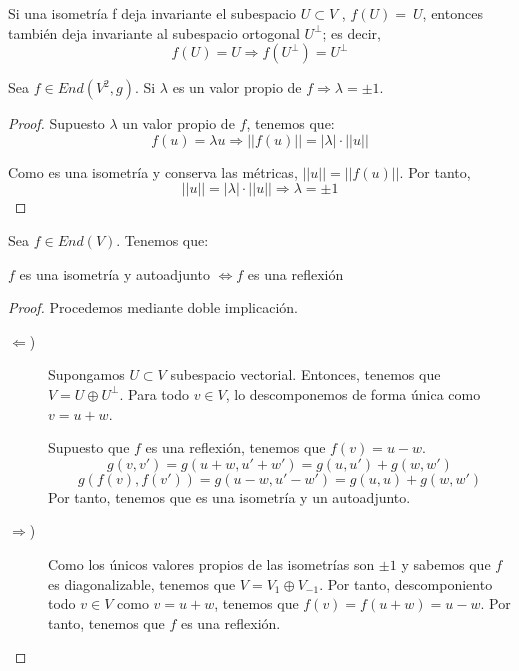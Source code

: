 \begin{prop}
    Si una isometría f deja invariante el subespacio $U \subset V$ , $f(U) =~U$, entonces también deja invariante al subespacio ortogonal $U^\perp$; es decir, $$f(U)=U\Longrightarrow f(U^\perp)=U^\perp$$
\end{prop}

\begin{prop}
    Sea $f\in End(V^2, g)$. Si $\lambda$ es un valor propio de $f \Longrightarrow \lambda=\pm 1$.
\end{prop}
\begin{proof}
    Supuesto $\lambda$ un valor propio de $f$, tenemos que: $$f(u)=\lambda u \Longrightarrow ||f(u)||=|\lambda|\cdot ||u||$$

    Como es una isometría y conserva las métricas, $||u||=||f(u)||$. Por tanto,
    \begin{equation*}
        ||u||=|\lambda|\cdot ||u|| \Longrightarrow \lambda = \pm 1
    \end{equation*}
\end{proof}

\begin{teo}
    Sea $f\in End(V)$. Tenemos que:
    \begin{center}
        $f$ es una isometría y autoadjunto $\Longleftrightarrow f$ es una reflexión 
    \end{center}
\end{teo}
\begin{proof} Procedemos mediante doble implicación.
    \begin{description}
        \item [$\Longleftarrow$)] Supongamos $U\subset V$ subespacio vectorial. Entonces, tenemos que $V=U\oplus U^\perp$. Para todo $v\in V$, lo descomponemos de forma única como $v=u+w$.

        Supuesto que $f$ es una reflexión, tenemos que $f(v)=u-w$.
        \begin{equation*}
            g(v,v') = g(u+w, u'+w') = g(u,u') + g(w,w')
        \end{equation*}
       \begin{equation*}
           g(f(v), f(v')) = g(u-w, u'-w') = g(u,u) + g(w,w')
       \end{equation*}
       Por tanto, tenemos que es una isometría y un autoadjunto.

       \item [$\Longrightarrow$)] Como los únicos valores propios de las isometrías son $\pm 1$ y sabemos que $f$ es diagonalizable, tenemos que $V=V_1 \oplus V_{-1}$. Por tanto, descomponiento todo $v\in V$ como $v=u+w$, tenemos que $f(v)=f(u+w) = u-w$. Por tanto, tenemos que $f$ es una reflexión.
    \end{description}
\end{proof}

